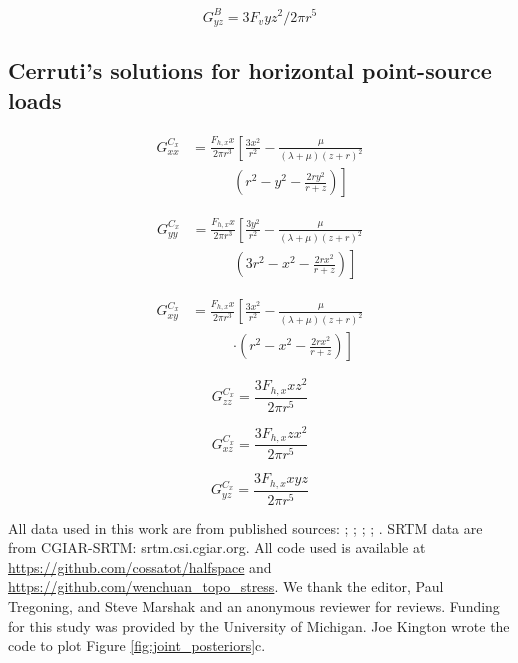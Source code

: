 \documentclass[draft,jgrga]{AGUTeX}
\begin{document}
\begin{article}
\begin{equation}
G_{yz}^{B} = 3 F _{v} yz^{2} / 2 \pi r^{5}
\end{equation}

\subsection{Cerruti's solutions for horizontal point-source
loads}\label{cerrutis-solutions-for-horizontal-point-source-loads}

\begin{equation}
\begin{split}
G_{xx}^{C_x} &= \frac{ F_{h,x} x }{2 \pi r^3} \left[ \frac{ 3x^2}{r^2} \right.
- \frac{\mu}{(\lambda + \mu)(z+r)^2} 
\\
&\qquad \quad  \left. (r^2 - y^2 - \frac{2ry^2}{r+z}) \right]
\end{split}
\end{equation}

\begin{equation}
\begin{split}
G_{yy}^{C_x} & = \frac{ F_{h,x} x }{2 \pi r^3} \left[ \frac{ 3y^2}{r^2} \right.
- \frac{\mu}{(\lambda + \mu)(z+r)^2} \\
& \qquad \quad \left. (3r^2 - x^2 - \frac{2rx^2}{r+z}) \right]
\end{split}
\end{equation}

\begin{equation}
\begin{split}
G_{xy}^{C_x} & = \frac{ F_{h,x} x }{2 \pi r^3} \left[ \frac{ 3x^2}{r^2} \right.
- \frac{\mu}{(\lambda + \mu)(z+r)^2} 
\\
&\qquad \quad \left. \cdot (r^2 - x^2 - \frac{2rx^2}{r+z}) \right]
\end{split}
\end{equation}

\begin{equation}
    G^{C_x}_{zz} = \frac{ 3 F_{h,x} x z^2 }{2 \pi r^5}
\end{equation}

\begin{equation}
    G^{C_x}_{xz} = \frac{ 3 F_{h,x} z x^2 }{2 \pi r^5}
\end{equation}

\begin{equation}
    G^{C_x}_{yz} = \frac{ 3 F_{h,x} x y z }{2 \pi r^5}
\end{equation}

\begin{acknowledgements}
All data used in this work are from published sources: \citet{shen2009};
\citet{feng2010}; \citet{qi2011}; \citet{zhang2011}; \citet{fielding2013}. SRTM
data are from CGIAR-SRTM: srtm.csi.cgiar.org. All code used is available at
\url{https://github.com/cossatot/halfspace} and
\url{https://github.com/wenchuan_topo_stress}. We thank the editor, Paul
Tregoning, and Steve Marshak and an anonymous reviewer for reviews. Funding for
this study was provided by the University of Michigan. Joe Kington wrote the
code to plot Figure \ref{fig:joint_posteriors}c.  
\end{acknowledgements}


\end{article}
\end{document}

